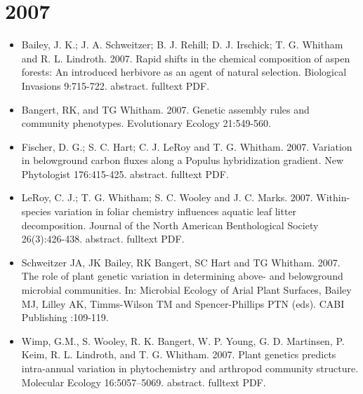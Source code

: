 \documentclass[12pt]{article}
\begin{document}
\section{2007}
\begin{itemize}
\item Bailey, J. K.; J. A. Schweitzer; B. J. Rehill; D. J. Irschick;
T. G. Whitham and R. L. Lindroth. 2007. Rapid shifts in the chemical
composition of aspen forests: An introduced herbivore as an agent of
natural selection. Biological Invasions 9:715-722. abstract. fulltext
PDF.

\item Bangert, RK, and TG Whitham. 2007. Genetic assembly rules and
community phenotypes. Evolutionary Ecology 21:549-560.

\item Fischer, D. G.; S. C. Hart; C. J. LeRoy and
T. G. Whitham. 2007. Variation in belowground carbon fluxes along a
Populus hybridization gradient. New Phytologist
176:415-425. abstract. fulltext PDF.
 
\item LeRoy, C. J.; T. G. Whitham; S. C. Wooley and
J. C. Marks. 2007. Within-species variation in foliar chemistry
influences aquatic leaf litter decomposition. Journal of the North
American Benthological Society 26(3):426-438. abstract. fulltext PDF.

\item Schweitzer JA, JK Bailey, RK Bangert, SC Hart and TG
Whitham. 2007. The role of plant genetic variation in determining
above- and belowground microbial communities. In: Microbial Ecology of
Arial Plant Surfaces, Bailey MJ, Lilley AK, Timms-Wilson TM and
Spencer-Phillips PTN (eds). CABI Publishing :109-119.

\item Wimp, G.M., S. Wooley, R. K. Bangert, W. P. Young, G. D. Martinsen,
P. Keim, R. L. Lindroth, and T. G. Whitham. 2007. Plant genetics
predicts intra-annual variation in phytochemistry and arthropod
community structure. Molecular Ecology
16:5057–5069. abstract. fulltext PDF.
 
\end{itemize}
\end{document}
